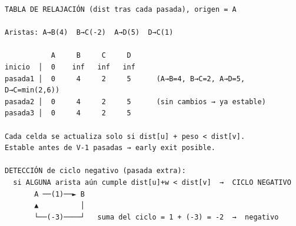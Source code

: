 \begin{dsacomofunciona}
\begin{verbatim}
TABLA DE RELAJACIÓN (dist tras cada pasada), origen = A

Aristas: A→B(4)  B→C(-2)  A→D(5)  D→C(1)

           A     B     C     D
inicio  │  0    inf   inf   inf
pasada1 │  0     4     2     5      (A→B=4, B→C=2, A→D=5, D→C=min(2,6))
pasada2 │  0     4     2     5      (sin cambios → ya estable)
pasada3 │  0     4     2     5

Cada celda se actualiza solo si dist[u] + peso < dist[v].
Estable antes de V-1 pasadas → early exit posible.

DETECCIÓN de ciclo negativo (pasada extra):
  si ALGUNA arista aún cumple dist[u]+w < dist[v]  →  CICLO NEGATIVO
       A ──(1)──► B
       ▲          │
       └──(-3)────┘   suma del ciclo = 1 + (-3) = -2  →  negativo
\end{verbatim}
\end{dsacomofunciona}

